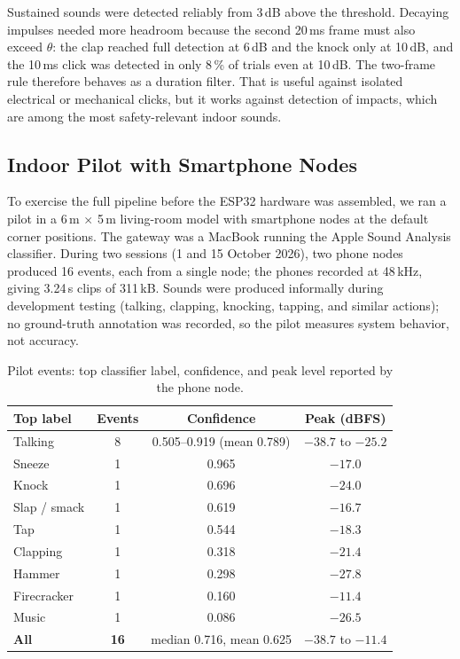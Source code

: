 \documentclass[conference]{IEEEtran}
\newcommand{\ms}{\,ms}
\begin{document}
Sustained sounds were detected reliably from 3\,dB above the threshold. Decaying impulses needed more headroom because the second 20\ms{} frame must also exceed $\theta$: the clap reached full detection at 6\,dB and the knock only at 10\,dB, and the 10\ms{} click was detected in only 8\,\% of trials even at 10\,dB. The two-frame rule therefore behaves as a duration filter. That is useful against isolated electrical or mechanical clicks, but it works against detection of impacts, which are among the most safety-relevant indoor sounds.

\subsection{Indoor Pilot with Smartphone Nodes}
To exercise the full pipeline before the ESP32 hardware was assembled, we ran a pilot in a 6\,m $\times$ 5\,m living-room model with smartphone nodes at the default corner positions. The gateway was a MacBook running the Apple Sound Analysis classifier. During two sessions (1 and 15 October 2026), two phone nodes produced 16 events, each from a single node; the phones recorded at 48\,kHz, giving 3.24\,s clips of 311\,kB. Sounds were produced informally during development testing (talking, clapping, knocking, tapping, and similar actions); no ground-truth annotation was recorded, so the pilot measures system behavior, not accuracy.

\begin{table}[!t]
\centering
\caption{Pilot events: top classifier label, confidence, and peak level reported by the phone node.}
\label{tab:pilot}
\renewcommand{\arraystretch}{1.05}
\footnotesize
\begin{tabular}{@{}l c c c@{}}
\toprule
\textbf{Top label} & \textbf{Events} & \textbf{Confidence} & \textbf{Peak (dBFS)} \\
\midrule
Talking & 8 & 0.505--0.919 (mean 0.789) & $-38.7$ to $-25.2$ \\
Sneeze & 1 & 0.965 & $-17.0$ \\
Knock & 1 & 0.696 & $-24.0$ \\
Slap / smack & 1 & 0.619 & $-16.7$ \\
Tap & 1 & 0.544 & $-18.3$ \\
Clapping & 1 & 0.318 & $-21.4$ \\
Hammer & 1 & 0.298 & $-27.8$ \\
Firecracker & 1 & 0.160 & $-11.4$ \\
Music & 1 & 0.086 & $-26.5$ \\
\midrule
\textbf{All} & \textbf{16} & median 0.716, mean 0.625 & $-38.7$ to $-11.4$ \\
\bottomrule
\end{tabular}
\end{table}
\end{document}
